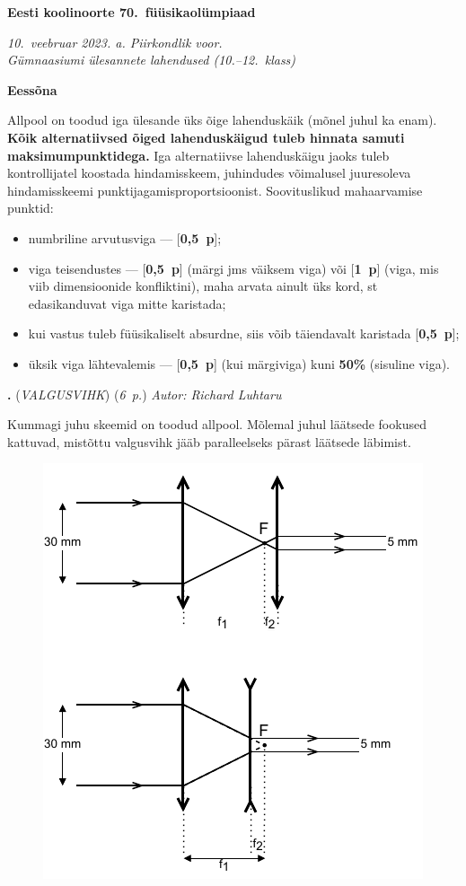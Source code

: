 \documentclass[11pt,a5paper]{article}
\newcommand{\numb}[1]{\vspace{5pt}\textbf{\large #1}}
\newcommand{\nimi}[1]{(\textsl{\small #1})}
\newcommand{\punktid}[1]{(\emph{#1~p.})}
\newcommand{\p}[1]{[\textbf{#1~p}]}
\newcounter{ylesanne}
\newcommand{\yl}[1]{\addtocounter{ylesanne}{1}\numb{\theylesanne.} \nimi{#1} \newblock{}}
\newcommand{\autor}[1]{\emph{Autor: #1}}%
\newenvironment{skeemlist}{\begin{itemize}[nosep, topsep=0pt, leftmargin=*]}{\end{itemize}}
\begin{document}
\normalsize
\begin{center}
  \textbf{\Large Eesti koolinoorte 70.\ füüsikaolümpiaad} \par
  \emph{10.\ veebruar 2023. a. Piirkondlik voor.\\ Gümnaasiumi ülesannete lahendused (10.--12.\ klass)}
\end{center}

\normalsize

\numb{Eessõna}

Allpool on toodud iga ülesande üks õige lahenduskäik (mõnel juhul ka enam). \textbf{Kõik alternatiivsed õiged lahenduskäigud tuleb hinnata samuti maksimumpunktidega.} Iga alternatiivse lahenduskäigu jaoks tuleb kontrollijatel koostada hindamisskeem, juhindudes võimalusel juuresoleva hindamisskeemi punktijagamisproportsioonist. Soovituslikud mahaarvamise punktid:
\begin{skeemlist}
  \item numbriline arvutusviga --- \p{0,5};
  \item viga teisendustes --- \p{0,5} (märgi jms väiksem viga) või \p{1} (viga, mis viib dimensioonide konfliktini), maha arvata ainult üks kord, st edasikanduvat viga mitte karistada;
  \item kui vastus tuleb füüsikaliselt absurdne, siis võib täiendavalt karistada \p{0,5};
  \item üksik viga lähtevalemis --- \p{0,5} (kui märgiviga) kuni \textbf{50\%} (sisuline viga).
\end{skeemlist}
\vspace{1em}

\yl{VALGUSVIHK}
\punktid{6} \autor{Richard Luhtaru}

Kummagi juhu skeemid on toodud allpool. Mõlemal juhul läätsede fookused kattuvad, mistõttu valgusvihk jääb paralleelseks pärast läätsede läbimist.

\begin{figure}[h]
    \centering
    \includegraphics[width=.5\linewidth]{valgusvihk-lah.pdf}
\end{figure}
\end{document}
